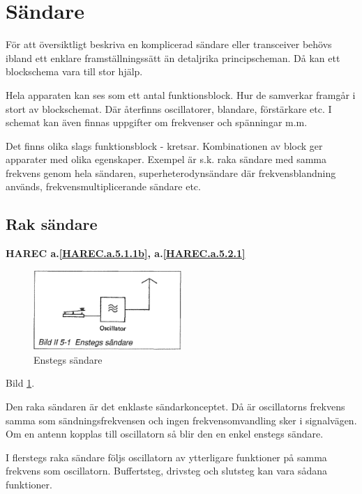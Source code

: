 \section{Sändare}
\label{sändare}

För att översiktligt beskriva en komplicerad sändare eller transceiver
behövs ibland ett enklare framställningssätt än detaljrika
principscheman. Då kan ett blockschema vara till stor hjälp.

Hela apparaten kan ses som ett antal funktionsblock. Hur de samverkar
framgår i stort av blockschemat. Där återfinns oscillatorer, blandare,
förstärkare etc. I schemat kan även finnas uppgifter om frekvenser och
spänningar m.m.

Det finns olika slags funktionsblock - kretsar. Kombinationen av block
ger apparater med olika egenskaper. Exempel är s.k. raka sändare med
samma frekvens genom hela sändaren, superheterodynsändare där
frekvensblandning används, frekvensmultiplicerande sändare etc.

\subsection{Rak sändare}
\textbf{
HAREC a.\ref{HAREC.a.5.1.1b}\label{myHAREC.a.5.1.1b},
 a.\ref{HAREC.a.5.2.1}\label{myHAREC.a.5.2.1}
}

\begin{figure}
  \includegraphics[width=0.5\textwidth]{images/bild_2_5-01}
  \caption{Enstegs sändare}
  \label{fig:bildII5-1}
\end{figure}

Bild \ref{fig:bildII5-1}.

Den raka sändaren är det enklaste sändarkonceptet. Då är oscillatorns
frekvens samma som sändningsfrekvensen och ingen frekvensomvandling
sker i signalvägen. Om en antenn kopplas till oscillatorn så blir den
en enkel enstegs sändare.

I flerstegs raka sändare följs oscillatorn av ytterligare funktioner
på samma frekvens som oscillatorn. Buffertsteg, drivsteg och slutsteg
kan vara sådana funktioner.

